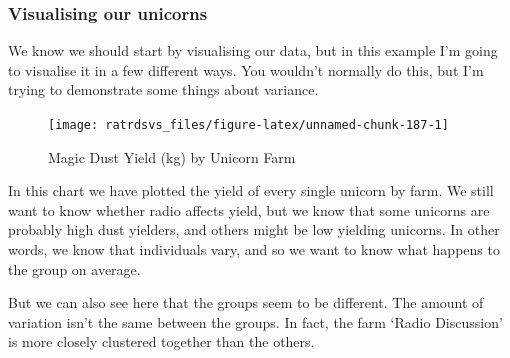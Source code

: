 \documentclass[
]{book}
\newenvironment{Shaded}{\begin{snugshade}}{\end{snugshade}}
\newcommand{\DataTypeTok}[1]{\textcolor[rgb]{0.13,0.29,0.53}{#1}}
\newcommand{\DecValTok}[1]{\textcolor[rgb]{0.00,0.00,0.81}{#1}}
\newcommand{\KeywordTok}[1]{\textcolor[rgb]{0.13,0.29,0.53}{\textbf{#1}}}
\newcommand{\NormalTok}[1]{#1}
\newcommand{\OperatorTok}[1]{\textcolor[rgb]{0.81,0.36,0.00}{\textbf{#1}}}
\newcommand{\StringTok}[1]{\textcolor[rgb]{0.31,0.60,0.02}{#1}}
\begin{document}
\hypertarget{visualising-our-unicorns}{%
\subsubsection{Visualising our unicorns}\label{visualising-our-unicorns}}

We know we should start by visualising our data, but in this example I'm going to visualise it in a few different ways. You wouldn't normally do this, but I'm trying to demonstrate some things about variance.

\begin{Shaded}
\end{Shaded}

\begin{figure}

{\centering \texttt{[image: ratrdsvs\_files/figure-latex/unnamed-chunk-187-1]} 

}

\caption{Magic Dust Yield (kg) by Unicorn Farm}\label{fig:unnamed-chunk-187}
\end{figure}

In this chart we have plotted the yield of every single unicorn by farm. We still want to know whether radio affects yield, but we know that some unicorns are probably high dust yielders, and others might be low yielding unicorns. In other words, we know that individuals vary, and so we want to know what happens to the group on average.

But we can also see here that the groups seem to be different. The amount of variation isn't the same between the groups. In fact, the farm `Radio Discussion' is more closely clustered together than the others.
\end{document}
